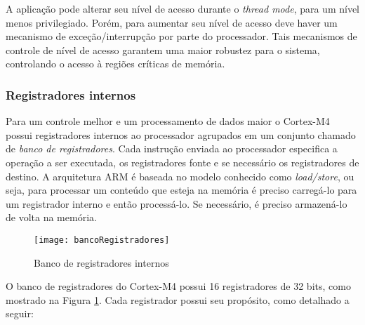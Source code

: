 A aplicação pode alterar seu nível de acesso durante o \emph{thread mode}, para um nível menos privilegiado. Porém, para aumentar seu nível de acesso deve haver um mecanismo de exceção/interrupção por parte do processador.  Tais mecanismos de controle de nível de acesso garantem uma maior robustez para o sistema, controlando o acesso à regiões críticas de memória.

\subsubsection{Registradores internos}

Para um controle melhor e um processamento de dados maior o Cortex-M4 possui registradores internos ao processador agrupados em um conjunto chamado de \emph{banco de registradores}. Cada instrução enviada ao processador especifica a operação a ser executada, os registradores fonte e se necessário os registradores de destino. A arquitetura ARM é baseada no modelo conhecido como \emph{load/store}, ou seja, para processar um conteúdo que esteja na memória é preciso carregá-lo para um registrador interno e então processá-lo. Se necessário, é preciso armazená-lo de volta na memória.

\begin{figure}[H]
	\centering
	\texttt{[image: bancoRegistradores]}
	\caption{Banco de registradores internos \cite{DATASHEET_TIVA}}
	\label{fig:bancoRegistradores}
\end{figure}

O banco de registradores do Cortex-M4 possui 16 registradores de 32 bits, como mostrado na Figura \ref{fig:bancoRegistradores}. Cada registrador possui seu propósito, como detalhado a seguir:

